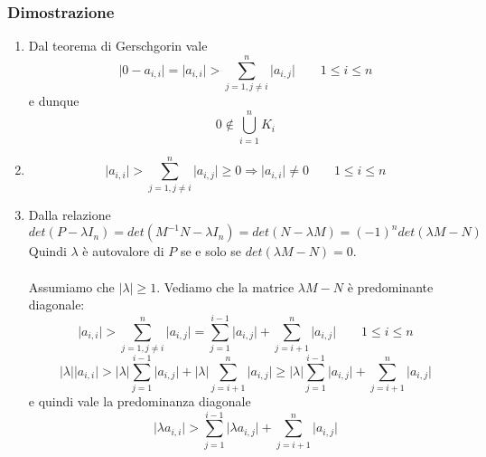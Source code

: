 \subsubsection{Dimostrazione}
\begin{enumerate}
	\item Dal teorema di Gerschgorin vale
	\begin{equation*}
		\lvert 0 - a_{i,i} \rvert = \lvert a_{i,i} \rvert > \sum_{j=1, j\neq i}^{n} \lvert a_{i,j} \rvert \quad\quad 1 \leq i \leq n
	\end{equation*}
	e dunque
	\begin{equation*}
		0 \notin \bigcup_{i=1}^n K_i
	\end{equation*}
	\item \begin{equation*}
		\lvert a_{i,i} \rvert > \sum_{j=1, j\neq i}^n \lvert a_{i,j} \rvert \geq 0 \Longrightarrow \lvert a_{i,i} \rvert \neq 0 \quad\quad 1 \leq i \leq n
	\end{equation*}
	\item  Dalla relazione
	\begin{equation*}
		det(P-\lambda I_n) = det(M^{-1}N-\lambda I_n) = det(N - \lambda M) = (-1)^n det(\lambda M - N)
	\end{equation*}
	Quindi $\lambda$ è autovalore di $P$ se e solo se $det(\lambda M - N) = 0$.\\\\
	Assumiamo che $\lvert \lambda \rvert \geq 1$. Vediamo che la matrice $\lambda M - N$ è predominante diagonale:
	\begin{equation*}
		\lvert a_{i,i} \rvert > \sum_{j=1, j\neq i}^n \lvert a_{i,j} \rvert = \sum_{j=1}^{i-1} \lvert a_{i,j} \rvert + \sum_{j=i+1}^{n} \lvert a_{i,j} \rvert \quad\quad 1 \leq i \leq n
	\end{equation*}
	\begin{equation*}
		\lvert \lambda \rvert \lvert a_{i,i} \rvert >\lvert \lambda \rvert  \sum_{j=1}^{i-1} \lvert a_{i,j} \rvert + \lvert \lambda \rvert \sum_{j=i+1}^{n} \lvert a_{i,j} \rvert \geq \lvert \lambda \rvert  \sum_{j=1}^{i-1} \lvert a_{i,j} \rvert + \sum_{j=i+1}^{n} \lvert a_{i,j} \rvert 
	\end{equation*}
	e quindi vale la predominanza diagonale
	\begin{equation*}
		\lvert \lambda a_{i,i} \rvert >\sum_{j=1}^{i-1} \lvert \lambda a_{i,j} \rvert + \sum_{j=i+1}^{n} \lvert a_{i,j} \rvert 
	\end{equation*}
	\begin{equation*}

\end{equation*}
\end{enumerate}
